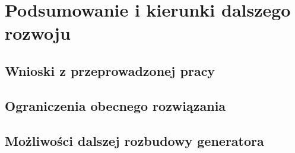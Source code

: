 \newpage
\section{Podsumowanie i kierunki dalszego rozwoju}

\subsection{Wnioski z przeprowadzonej pracy}

\subsection{Ograniczenia obecnego rozwiązania}

\subsection{Możliwości dalszej rozbudowy generatora}